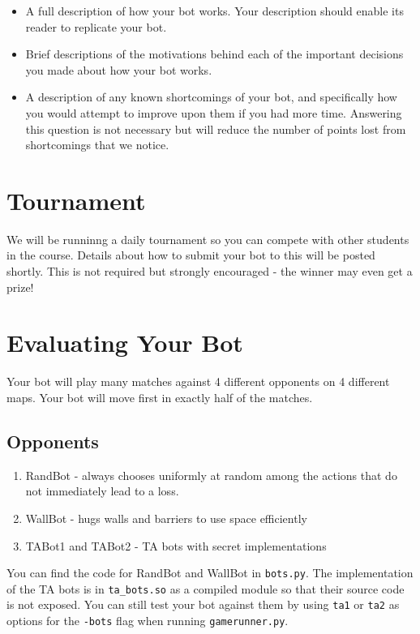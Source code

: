 \documentclass{article}
\begin{document}
\begin{itemize}
\item A full description of how your bot works. Your description should enable its reader to replicate your bot.

\item Brief descriptions of the motivations behind each of the important decisions you made about how your bot works.

\item A description of any known shortcomings of your bot, and specifically how you would attempt to improve upon them if you had more time. Answering this question is not necessary but will reduce the number of points lost from shortcomings that we notice.
\end{itemize}

\section{Tournament}
We will be runninng a daily tournament so you can compete with other students in the course.
Details about how to submit your bot to this will be posted shortly.
This is not required but strongly encouraged - the winner may even get a prize!

\section{Evaluating Your Bot}
Your bot will play many matches against 4 different opponents on 4 different maps.
Your bot will move first in exactly half of the matches.

\subsection{Opponents}
\begin{enumerate}
    \item RandBot - always chooses uniformly at random among the actions that do not immediately lead to a loss.

    \item WallBot - hugs walls and barriers to use space efficiently

    \item TABot1 and TABot2 - TA bots with secret implementations
\end{enumerate}
You can find the code for RandBot and WallBot in \verb|bots.py|. The implementation of the TA bots is in \verb|ta_bots.so| as a compiled module so that their source code is not exposed. You can still test your bot against them by using \texttt{ta1} or \texttt{ta2} as options for the \texttt{-bots} flag when running \texttt{gamerunner.py}.
\end{document}
